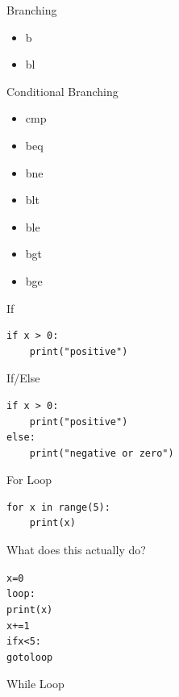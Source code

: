 
\begin{frame}{Branching}

	\begin{itemize}
		\item b
		\item bl
	\end{itemize}

\end{frame}

\begin{frame}{Conditional Branching}

	\begin{itemize}
		\item cmp
		\item beq
		\item bne
		\item blt
		\item ble
		\item bgt
		\item bge
	\end{itemize}

\end{frame}


\begin{frame}{If}

\begin{verbatim}
if x > 0:
    print("positive")
\end{verbatim}

\end{frame}


\begin{frame}{If/Else}


\begin{verbatim}
if x > 0:
    print("positive")
else:
    print("negative or zero")
\end{verbatim}


\end{frame}


\begin{frame}{For Loop}

\begin{verbatim}
for x in range(5):
    print(x)
\end{verbatim}

What does this actually do?

\begin{alltt}
x = 0
loop:
print(x)
x += 1
if x < 5:
    goto loop
\end{alltt}




\end{frame}


\begin{frame}{While Loop}

\end{frame}
